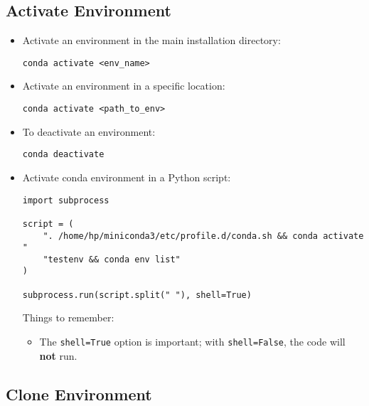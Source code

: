 
\subsection{Activate Environment}
\label{conda:activateEnv}

\begin{itemize}
    \item Activate an environment in the main installation directory:
    \begin{verbatim}
conda activate <env_name>
    \end{verbatim}
    \item Activate an environment in a specific location:
    \begin{verbatim}
conda activate <path_to_env>
    \end{verbatim}
    \item To deactivate an environment:
    \begin{verbatim}
conda deactivate
    \end{verbatim}
    \newpage
    \item Activate conda environment in a Python script:
    \begin{verbatim}
import subprocess

script = (
    ". /home/hp/miniconda3/etc/profile.d/conda.sh && conda activate "
    "testenv && conda env list"
)

subprocess.run(script.split(" "), shell=True)
    \end{verbatim}
    Things to remember:
    \begin{itemize}
        \item The \texttt{shell=True} option is important; with 
        \texttt{shell=False}, the code will \textbf{not} run.
    \end{itemize}
\end{itemize}


\subsection{Clone Environment}

